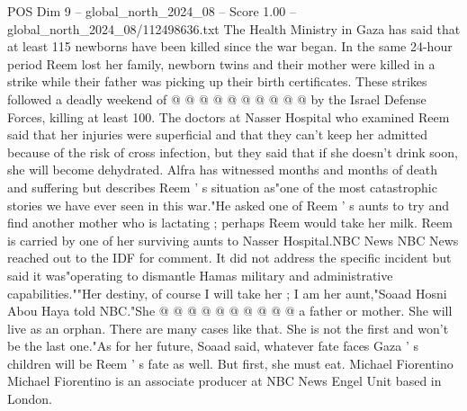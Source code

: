\begin{textsample}{POS Dim 9 – global\_north\_2024\_08 – Score 1.00 – global\_north\_2024\_08/112498636.txt}
The Health Ministry in Gaza has said that at least 115 newborns have been killed since the war began.
In the same 24-hour period Reem lost her family, newborn twins and their mother were killed in a strike while their father was picking up their birth certificates.
These strikes followed a deadly weekend of @ @ @ @ @ @ @ @ @ @ by the Israel Defense Forces, killing at least 100.
The doctors at Nasser Hospital who examined Reem said that her injuries were superficial and that they can't keep her admitted because of the risk of cross infection, but they said that if she doesn't drink soon, she will become dehydrated.
Alfra has witnessed months and months of death and suffering but describes Reem ' s situation as"one of the most catastrophic stories we have ever seen in this war."He asked one of Reem ' s aunts to try and find another mother who is lactating ; perhaps Reem would take her milk.
Reem is carried by one of her surviving aunts to Nasser Hospital.NBC News NBC News reached out to the IDF for comment.
It did not address the specific incident but said it was"operating to dismantle Hamas military and administrative capabilities.""Her destiny, of course I will take her ; I am her aunt,"Soaad Hosni Abou Haya told NBC."She @ @ @ @ @ @ @ @ @ @ a father or mother.
She will live as an orphan.
There are many cases like that.
She is not the first and won't be the last one."As for her future, Soaad said, whatever fate faces Gaza ' s children will be Reem ' s fate as well.
But first, she must eat.
Michael Fiorentino Michael Fiorentino is an associate producer at NBC News Engel Unit based in London.

\end{textsample}
